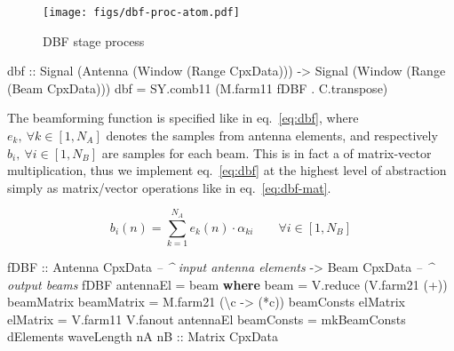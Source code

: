 \documentclass[
  a4paper,
]{article}
\newenvironment{Shaded}{}{}
\newcommand{\CommentTok}[1]{\textcolor[rgb]{0.38,0.63,0.69}{\textit{#1}}}
\newcommand{\DataTypeTok}[1]{\textcolor[rgb]{0.56,0.13,0.00}{#1}}
\newcommand{\FunctionTok}[1]{\textcolor[rgb]{0.02,0.16,0.49}{#1}}
\newcommand{\KeywordTok}[1]{\textcolor[rgb]{0.00,0.44,0.13}{\textbf{#1}}}
\newcommand{\NormalTok}[1]{#1}
\newcommand{\OtherTok}[1]{\textcolor[rgb]{0.00,0.44,0.13}{#1}}
\begin{document}
\begin{figure}
\hypertarget{fig:cube-dbf-proc-shallow}{%
\centering
\texttt{[image: figs/dbf-proc-atom.pdf]}
\caption{DBF stage process}\label{fig:cube-dbf-proc-shallow}
}
\end{figure}

\begin{Shaded}
\begin{Highlighting}[numbers=left,,firstnumber=130,]
\OtherTok{dbf ::} \DataTypeTok{Signal}\NormalTok{ (}\DataTypeTok{Antenna}\NormalTok{ (}\DataTypeTok{Window}\NormalTok{ (}\DataTypeTok{Range} \DataTypeTok{CpxData}\NormalTok{)))}
    \OtherTok{->} \DataTypeTok{Signal}\NormalTok{ (}\DataTypeTok{Window}\NormalTok{  (}\DataTypeTok{Range}\NormalTok{  (}\DataTypeTok{Beam}  \DataTypeTok{CpxData}\NormalTok{)))}
\NormalTok{dbf }\FunctionTok{=}\NormalTok{ SY.comb11 (M.farm11 fDBF }\FunctionTok{.}\NormalTok{ C.transpose)}
\end{Highlighting}
\end{Shaded}

The beamforming function is specified like in eq.~\ref{eq:dbf}, where
\(e_k ,\ \forall k \in [1,N_A]\) denotes the samples from antenna
elements, and respectively \(b_i,\ \forall i \in [1,N_B]\) are samples
for each beam. This is in fact a of matrix-vector multiplication, thus
we implement eq.~\ref{eq:dbf} at the highest level of abstraction simply
as matrix/vector operations like in eq.~\ref{eq:dbf-mat}.

\begin{equation} b_i(n) = \sum_{k=1}^{N_A} e_k(n) \cdot \alpha_{ki}\qquad\forall i \in [1,N_B] \label{eq:dbf}\end{equation}

\begin{Shaded}
\begin{Highlighting}[numbers=left,,firstnumber=142,]
\OtherTok{fDBF ::} \DataTypeTok{Antenna} \DataTypeTok{CpxData} \CommentTok{-- ^ input antenna elements}
     \OtherTok{->} \DataTypeTok{Beam}    \DataTypeTok{CpxData} \CommentTok{-- ^ output beams}
\NormalTok{fDBF antennaEl }\FunctionTok{=}\NormalTok{ beam}
  \KeywordTok{where}
\NormalTok{    beam       }\FunctionTok{=}\NormalTok{ V.reduce (V.farm21 (}\FunctionTok{+}\NormalTok{)) beamMatrix}
\NormalTok{    beamMatrix }\FunctionTok{=}\NormalTok{ M.farm21 (\textbackslash{}c }\OtherTok{->}\NormalTok{ (}\FunctionTok{*}\NormalTok{c)) beamConsts elMatrix}
\NormalTok{    elMatrix   }\FunctionTok{=}\NormalTok{ V.farm11 V.fanout antennaEl}
\NormalTok{    beamConsts }\FunctionTok{=}\NormalTok{ mkBeamConsts dElements waveLength nA}\OtherTok{ nB ::} \DataTypeTok{Matrix} \DataTypeTok{CpxData}
\end{Highlighting}
\end{Shaded}
\end{document}

